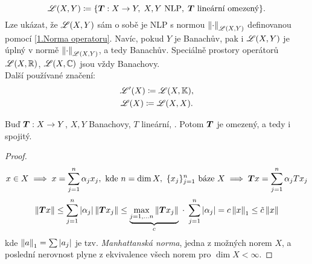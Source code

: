 \begin{definition}

$$
    \mathscr{L}(X, Y)
    \coloneqq
    \{
        \boldsymbol{T}: X \to Y, \;
        X,Y \text{ NLP}, \;
        \boldsymbol{T} \text{ lineární omezený}
    \}.
$$
Lze ukázat, že $\mathscr{L}(X, Y)$ sám o sobě je NLP s normou $\left\lVert\cdot\right\rVert_{\mathscr{L}(X,Y)}$ definovanou pomocí \ref{1.Norma operatoru}. Navíc, pokud $Y$ je Banachův, pak i $\mathscr{L}(X, Y)$ je úplný v normě $\left\lVert\cdot\right\rVert_{\mathscr{L}(X,Y)}$, a tedy Banachův. Speciálně prostory operátorů $\mathscr{L}(X, \mathbb{R})$, $\mathscr{L}(X, \mathbb{C})$ jsou vždy Banachovy.
\\
Další používané značení:
\begin{gather*}
    \mathscr{L}'(X) \coloneqq \mathscr{L}(X, \mathbb{K}), \\
    \mathscr{L}(X) \coloneqq \mathscr{L}(X, X).
\end{gather*}
\end{definition}

\begin{theorem}
Buď $\boldsymbol{T}: X \to Y$, $X,Y$ Banachovy, $T$ lineární, . Potom $\boldsymbol{T}$ je omezený, a tedy i spojitý.
\end{theorem}
\begin{proof}
$$
    x \in X
    \implies
    x = \sum_{j=1}^n \alpha_j x_j, \text{ kde } n = \dim X, \text{ } \{ x_j \}_{j=1}^n \text{ báze } X
    \implies
    \boldsymbol{T}x = \sum_{j=1}^n \alpha_j T x_j
$$
$$
    \left\lVert\boldsymbol{T}x\right\rVert
    \leq
    \sum_{j=1}^n |\alpha_j| \left\lVert\boldsymbol{T}x_j\right\rVert
    \leq
    \underbrace{
        \underset{j=1,\dots n}{\max} \left\lVert\boldsymbol{T}x_j\right\rVert
    }_{c}
    \; \cdot \;
    \sum_{j=1}^n |\alpha_j|
    =
    c \left\lVert x\right\rVert_1
    \leq
    \Tilde{c} \left\lVert x\right\rVert
$$
kde $\left\lVert a\right\rVert_1 = \sum |a_j|$ je tzv. \textit{Manhattanská norma}, jedna z možných norem $X$, a poslední nerovnost plyne z ekvivalence všech norem pro $\dim X < \infty$.
\end{proof}

